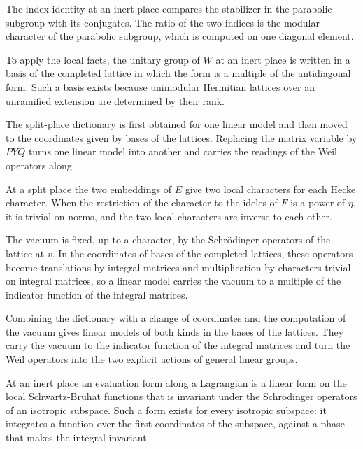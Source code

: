 The index identity at an inert place compares the stabilizer in the parabolic
subgroup with its conjugates. The ratio of the two indices is the modular
character of the parabolic subgroup, which is computed on one diagonal element.

To apply the local facts, the unitary group of $W$ at an inert place is written
in a basis of the completed lattice in which the form is a multiple of the
antidiagonal form. Such a basis exists because unimodular Hermitian lattices
over an unramified extension are determined by their rank.

The split-place dictionary is first obtained for one linear model and then moved
to the coordinates given by bases of the lattices. Replacing the matrix variable
by $PYQ$ turns one linear model into another and carries the readings of the
Weil operators along.

At a split place the two embeddings of $E$ give two local characters for each
Hecke character. When the restriction of the character to the ideles of $F$ is a
power of $\eta$, it is trivial on norms, and the two local characters are
inverse to each other.

The vacuum is fixed, up to a character, by the Schrödinger operators of the
lattice at $v$. In the coordinates of bases of the completed lattices, these
operators become translations by integral matrices and multiplication by
characters trivial on integral matrices, so a linear model carries the vacuum
to a multiple of the indicator function of the integral matrices.

Combining the dictionary with a change of coordinates and the computation of
the vacuum gives linear models of both kinds in the bases of the lattices.
They carry the vacuum to the indicator function of the integral matrices and
turn the Weil operators into the two explicit actions of general linear groups.

At an inert place an evaluation form along a Lagrangian is a linear form on the
local Schwartz-Bruhat functions that is invariant under the Schrödinger
operators of an isotropic subspace. Such a form exists for every isotropic
subspace: it integrates a function over the first coordinates of the subspace,
against a phase that makes the integral invariant.

